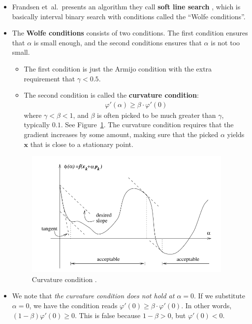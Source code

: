 \documentclass[10pt]{article}
\newcommand{\ve}[1]{\mathbf{#1}}
\newcommand{\etal}{{et~al.}}
\begin{document}
\begin{itemize}
    \item Frandsen \etal\ presents an algorithm they call {\bf soft line search} \cite{Frandsen:2004}, which is basically interval binary search with conditions called the ``Wolfe conditions''.
    
    \item The {\bf Wolfe conditions} \cite{Norcedal:2006} consists of two conditions. The first condition ensures that $\alpha$ is small enough, and the second conditions ensures that $\alpha$ is not too small.
    \begin{itemize}
        \item The first condition is just the Armijo condition with the extra requirement that $\gamma < 0.5$.
        \item The second condition is called the {\bf curvature condition}:
        \begin{align*}
            \varphi'(\alpha) \geq \beta \cdot \varphi'(0)
        \end{align*}
        where $\gamma < \beta < 1$, and $\beta$ is often picked to be much greater than $\gamma$, typically $0.1$. See Figure~\ref{fig:wolfe-curvature-condition}. The curvature condition requires that the gradient increases by some amount, making sure that the picked $\alpha$ yields $\ve{x}$ that is close to a stationary point.
    \end{itemize}

    \begin{figure}
        \centering
        \includegraphics[width=4in]{wolfe-curvature-condition.png}
        \caption{Curvature condition \cite{Cao:2021,Norcedal:2006}.}
        \label{fig:wolfe-curvature-condition}
    \end{figure}

    \item We note that \emph{the curvature condition does not hold at $\alpha = 0$}. If we substitute $\alpha = 0$, we have the condition reads $\varphi'(0) \geq \beta \cdot \varphi'(0)$. In other words, $(1 - \beta) \varphi'(0) \geq 0$. This is false because $1 - \beta > 0$, but $\varphi'(0) < 0$.


\end{itemize}
\end{document}

